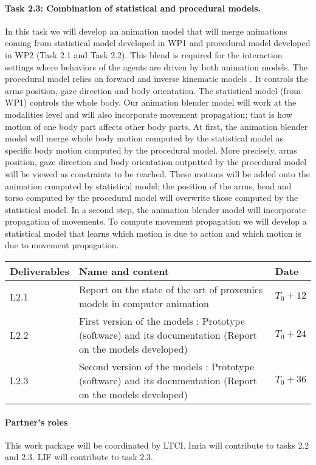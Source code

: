\paragraph{Task 2.3:  Combination of statistical and procedural models.}

In this task we will develop an animation model that will merge animations coming from statistical model developed in WP1 and procedural model developed in WP2 (Task 2.1 and Task 2.2). This blend is required for the interaction settings where behaviors of the agents are driven by both animation models.  The procedural model relies on forward and inverse kinematic models \cite{huang:2012:EET}. It controls the arms position, gaze direction and body orientation. The statistical model (from WP1) controls the whole body.  Our animation blender model will work at the modalities level and will also incorporate movement propagation; that is how motion of one body part affects other body parts. At first, the animation blender model will merge whole body motion computed by the statistical model as specific body motion computed by the procedural model. More precisely, arms position, gaze direction and body orientation outputted by the procedural model will be viewed as constraints to be reached. These motions will be 
added onto the animation computed by statistical model; the position of the arms, head and torso computed by the procedural model will overwrite those computed by the statistical model. In a second step, the animation blender model will incorporate propagation of movements. To compute movement propagation we will develop a statistical model that learns which motion is due to action and which motion is due to movement propagation.

\vspace{5mm}

\begin{tabular}{|l|p{10cm}|l|}\hline
Deliverables & Name and content  & Date  \\\hline
L2.1  & Report on the state of the art of proxemics models in computer animation&   $T_0+12$  \\\hline
L2.2  &  First version of the models : Prototype (software) and its documentation (Report on the models developed) & $T_0+24$ \\\hline
L2.3  &  Second version of the models : Prototype (software) and its documentation (Report on the models developed) &  $T_0+36$ \\\hline
\end{tabular}

\paragraph{Partner's roles} This work package  will be coordinated by LTCI. Inria  will contribute to tasks 2.2 and 2.3. LIF will contribute to task 2.3.
 
\endinput
